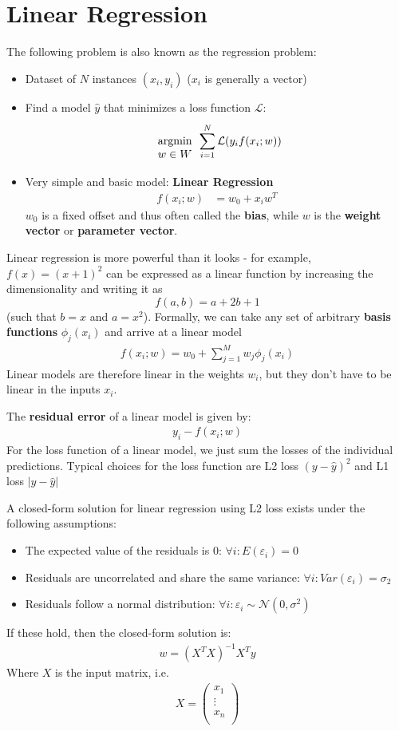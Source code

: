 \documentclass{report}
\renewcommand\epsilon{\varepsilon}
\newcommand{\tbf}{\textbf}
\newcommand{\argmin}[1] {
    \begin{array}{c}
        \vphantom{#1}\\ %
        \text{argmin}\\
        #1\\
        \end{array}
    }
\newcommand*{\newpar}{\par\vspace{\baselineskip}\noindent}
\newcommand{\loss}{\mathcal{L}}
\newcommand{\yhat}{\hat{y}}
\begin{document}
\section{Linear Regression}
The following problem is also known as the regression problem:
\begin{itemize}
 \item Dataset of $N$ instances $(x_i, y_i)$ ($x_i$ is generally a vector) 
 \item Find a model $\yhat$ that minimizes a loss function $\loss$:
 \begin{align*}
  \argmin{w \in W} \sum_{i=1}^{N} \loss(y_i f(x_i; w))
 \end{align*}
 \item Very simple and basic model: \tbf{Linear Regression}
 \begin{align*}
  f(x_i;w) &= w_0 + x_i w^{T}
 \end{align*}
 $w_0$ is a fixed offset and thus often called the \tbf{bias}, while $w$ is the \tbf{weight vector} or \tbf{parameter vector}.
\end{itemize}
Linear regression is more powerful than it looks - for example, $f(x) = (x+1)^2$ can be expressed as a linear function by increasing the dimensionality and writing it as \[f(a,b) = a +2b + 1\] (such that $b = x$ and $a = x^2$). Formally, we can take any set of arbitrary \tbf{basis functions} $\phi_j(x_i)$ and arrive at a linear model
\begin{align*}
 f(x_i;w) = w_0 + \sum_{j=1}^{M} w_j \phi_j(x_i)
\end{align*}
Linear models are therefore linear in the weights $w_i$, but they don't have to be linear in the inputs $x_i$.
\newpar
The \tbf{residual error} of a linear model is given by:
\begin{align*}
 y_i - f(x_i;w)
\end{align*}
For the loss function of a linear model, we just sum the losses of the individual predictions. Typical choices for the loss function are L2 loss $(y-\yhat)^2$ and L1 loss $|y - \yhat|$
\newpar
A closed-form solution for linear regression using L2 loss exists under the following assumptions:
\begin{itemize}
 \item The expected value of the residuals is 0: $\forall i: E(\epsilon_i) = 0$
 \item Residuals are uncorrelated and share the same variance: $\forall i: Var(\epsilon_i) = \sigma_2$
 \item Residuals follow a normal distribution: $\forall i: \epsilon_i \sim \mathcal{N}(0,\sigma^2)$
\end{itemize}
If these hold, then the closed-form solution is:
\begin{align}
 w = (X^T X)^{-1} X^T y
\end{align}
Where $X$ is the input matrix, i.e.
\begin{align*}
X = 
\begin{pmatrix}
x_1\\
\vdots\\
x_n\\
\end{pmatrix}
\end{align*}
%
\end{document}
